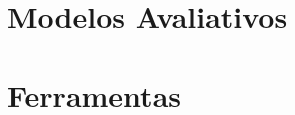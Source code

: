 


\section{Modelos Avaliativos}\label{sec:Engenharia}



\section{Ferramentas}\label{sec:Ferramentas}